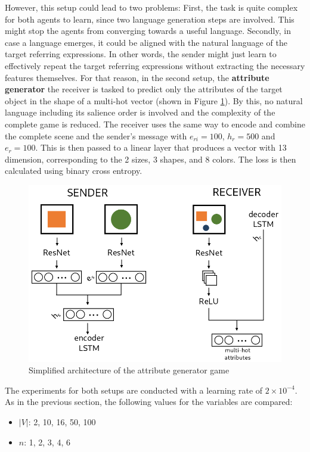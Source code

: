 However, this setup could lead to two problems:
First, the task is quite complex for both agents to learn, since two language generation steps are involved.
This might stop the agents from converging towards a useful language.
Secondly, in case a language emerges, it could be aligned with the natural language of the target referring expressions.
In other words, the sender might just learn to effectively repeat the target referring expressions without extracting the necessary features themselves.
For that reason, in the second setup, the \textbf{attribute generator} the receiver is tasked to predict only the attributes of the target object in the shape of a multi-hot vector (shown in Figure \ref{fig:attribute_generator_game_architecture}).
By this, no natural language including its salience order is involved and the complexity of the complete game is reduced.
The receiver uses the same way to encode and combine the complete scene and the sender's message with $e_{ri}=100$, $h_r=500$ and $e_r=100$.
This is then passed to a linear layer that produces a vector with 13 dimension, corresponding to the 2 sizes, 3 shapes, and 8 colors.
The loss is then calculated using binary cross entropy.

\begin{figure}[ht]
    \centering
    \includegraphics[width=.55\linewidth]{figures/arch_attribute_generator_game.png}
    \caption{Simplified architecture of the attribute generator game}
    \label{fig:attribute_generator_game_architecture}
\end{figure}

The experiments for both setups are conducted with a learning rate of $2\times10^{-4}$.
As in the previous section, the following values for the variables are compared:
\begin{itemize}
    \item $|V|$: 2, 10, 16, 50, 100
    \item $n$: 1, 2, 3, 4, 6
\end{itemize}

